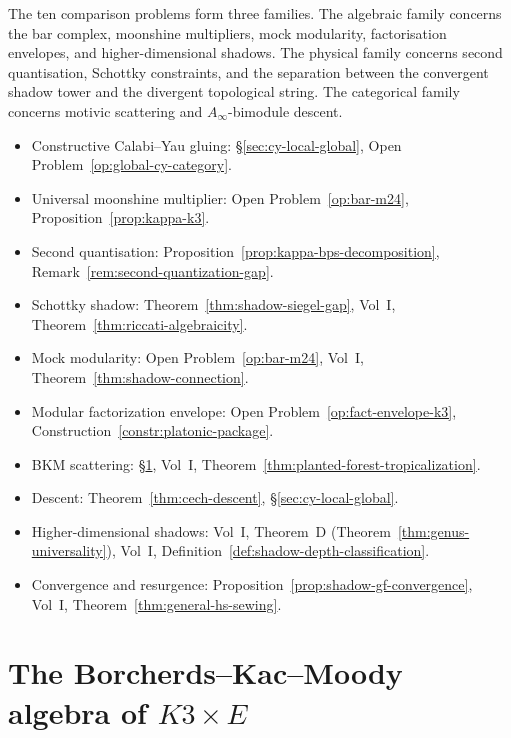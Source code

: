 \begin{remark}
\label{rem:cy-programme-summary}
The ten comparison problems form three families.  The algebraic family
concerns the bar complex, moonshine multipliers, mock modularity,
factorisation envelopes, and higher-dimensional shadows.  The physical
family concerns second quantisation, Schottky constraints, and the
separation between the convergent shadow tower and the divergent
topological string.  The categorical family concerns motivic scattering
and \(A_\infty\)-bimodule descent.
\begin{itemize}
\item Constructive Calabi--Yau gluing: \S\ref{sec:cy-local-global},
 Open Problem~\ref{op:global-cy-category}.
\item Universal moonshine multiplier: Open Problem~\ref{op:bar-m24},
 Proposition~\ref{prop:kappa-k3}.
\item Second quantisation: Proposition~\ref{prop:kappa-bps-decomposition},
 Remark~\ref{rem:second-quantization-gap}.
\item Schottky shadow: Theorem~\ref{thm:shadow-siegel-gap},
 Vol~I, Theorem~\ref{thm:riccati-algebraicity}.
\item Mock modularity: Open Problem~\ref{op:bar-m24},
 Vol~I, Theorem~\ref{thm:shadow-connection}.
\item Modular factorization envelope: Open Problem~\ref{op:fact-envelope-k3},
 Construction~\ref{constr:platonic-package}.
\item BKM scattering: \S\ref{sec:bkm-k3e},
 Vol~I, Theorem~\ref{thm:planted-forest-tropicalization}.
\item Descent: Theorem~\ref{thm:cech-descent},
 \S\ref{sec:cy-local-global}.
\item Higher-dimensional shadows: Vol~I, Theorem~D
 (Theorem~\ref{thm:genus-universality}),
 Vol~I, Definition~\ref{def:shadow-depth-classification}.
\item Convergence and resurgence: Proposition~\ref{prop:shadow-gf-convergence},
 Vol~I, Theorem~\ref{thm:general-hs-sewing}.
\end{itemize}
\end{remark}


\section{The Borcherds--Kac--Moody algebra of \texorpdfstring{$K3 \times E$}{K3 x E}}
\label{sec:bkm-k3e}

